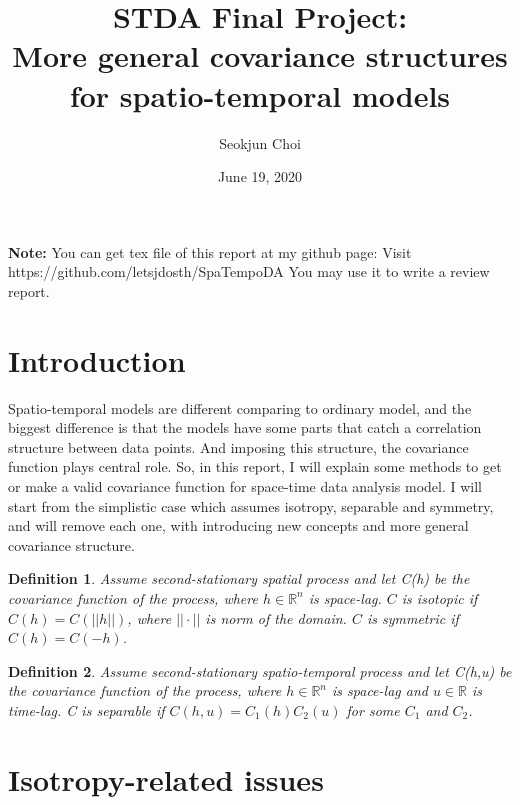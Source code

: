 \documentclass{article}
\newtheorem*{definition}{Definition}
\begin{document}
\title{STDA Final Project: \\ More general covariance structures for spatio-temporal models}
\author{Seokjun Choi}
\date{June 19, 2020}
\maketitle

\textbf{Note:}
You can get tex file of this report at my github page: Visit https://github.com/letsjdosth/SpaTempoDA
You may use it to write a review report.

\section{Introduction}

Spatio-temporal models are different comparing to ordinary model, and the biggest difference is that
the models have some parts that catch a correlation structure between data points.
And imposing this structure, the covariance function plays central role.
So, in this report, I will explain some methods to get or make a valid covariance function for space-time data analysis model.
I will start from the simplistic case which assumes isotropy, separable and symmetry,
and will remove each one, with introducing new concepts and more general covariance structure.
\begin{definition}
    Assume second-stationary spatial process and let C(h) be the covariance function of the process, where $h\in\mathbb R^n$ is space-lag.
    $C$ is isotopic if $C(h)=C(||h||)$, where $||\cdot||$ is norm of the domain.
    $C$ is symmetric if $C(h)=C(-h)$.
\end{definition}
\begin{definition}
    Assume second-stationary spatio-temporal process and let C(h,u) be the covariance function of the process, where $h\in\mathbb R^n$ is space-lag and $u\in\mathbb R$ is time-lag.
    C is separable if $C(h,u)=C_1(h)C_2(u)$ for some $C_1$ and $C_2$.
\end{definition}

\section{Isotropy-related issues}
\end{document}
